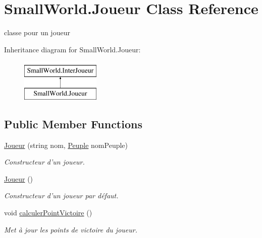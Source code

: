 \hypertarget{class_small_world_1_1_joueur}{\section{Small\-World.\-Joueur Class Reference}
\label{class_small_world_1_1_joueur}
}


classe pour un joueur  


Inheritance diagram for Small\-World.\-Joueur\-:\begin{figure}[H]
\begin{center}
\leavevmode
\includegraphics[height=2.000000cm]{class_small_world_1_1_joueur}
\end{center}
\end{figure}
\subsection*{Public Member Functions}
\begin{DoxyCompactItemize}
\item 
\hyperlink{class_small_world_1_1_joueur_ae9efc678037dc30e757898510cd4f9f2}{Joueur} (string nom, \hyperlink{class_small_world_1_1_peuple}{Peuple} nom\-Peuple)
\begin{DoxyCompactList}\small\item\em Constructeur d'un joueur. \end{DoxyCompactList}\item 
\hyperlink{class_small_world_1_1_joueur_a60844b7ba0c1294462c559644ed88bf1}{Joueur} ()
\begin{DoxyCompactList}\small\item\em Constructeur d'un joueur par défaut. \end{DoxyCompactList}\item 
void \hyperlink{class_small_world_1_1_joueur_aaa0f98cea097955f2c75e978433a7c68}{calculer\-Point\-Victoire} ()
\begin{DoxyCompactList}\small\item\em Met à jour les points de victoire du joueur. \end{DoxyCompactList}\end{DoxyCompactItemize}

